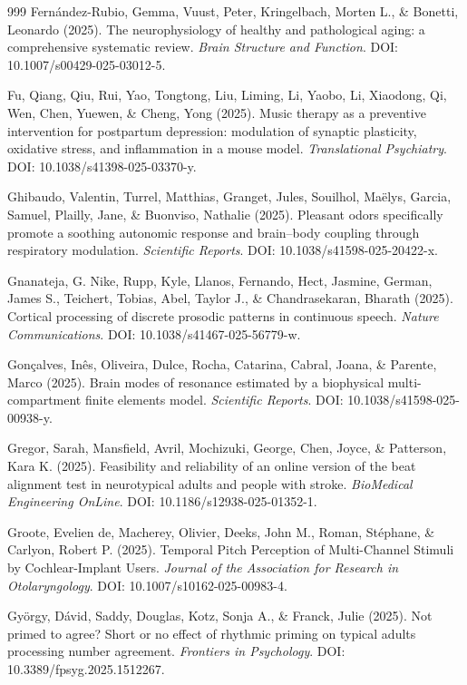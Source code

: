 \documentclass[9pt,onecolumn]{article}
\begin{document}
\begin{thebibliography}{999}
Fernández-Rubio, Gemma, Vuust, Peter, Kringelbach, Morten L., \& Bonetti, Leonardo (2025). The neurophysiology of healthy and pathological aging: a comprehensive systematic review. \textit{Brain Structure and Function}. DOI: 10.1007/s00429-025-03012-5.

Fu, Qiang, Qiu, Rui, Yao, Tongtong, Liu, Liming, Li, Yaobo, Li, Xiaodong, Qi, Wen, Chen, Yuewen, \& Cheng, Yong (2025). Music therapy as a preventive intervention for postpartum depression: modulation of synaptic plasticity, oxidative stress, and inflammation in a mouse model. \textit{Translational Psychiatry}. DOI: 10.1038/s41398-025-03370-y.

Ghibaudo, Valentin, Turrel, Matthias, Granget, Jules, Souilhol, Maëlys, Garcia, Samuel, Plailly, Jane, \& Buonviso, Nathalie (2025). Pleasant odors specifically promote a soothing autonomic response and brain–body coupling through respiratory modulation. \textit{Scientific Reports}. DOI: 10.1038/s41598-025-20422-x.

Gnanateja, G. Nike, Rupp, Kyle, Llanos, Fernando, Hect, Jasmine, German, James S., Teichert, Tobias, Abel, Taylor J., \& Chandrasekaran, Bharath (2025). Cortical processing of discrete prosodic patterns in continuous speech. \textit{Nature Communications}. DOI: 10.1038/s41467-025-56779-w.

Gonçalves, Inês, Oliveira, Dulce, Rocha, Catarina, Cabral, Joana, \& Parente, Marco (2025). Brain modes of resonance estimated by a biophysical multi-compartment finite elements model. \textit{Scientific Reports}. DOI: 10.1038/s41598-025-00938-y.

Gregor, Sarah, Mansfield, Avril, Mochizuki, George, Chen, Joyce, \& Patterson, Kara K. (2025). Feasibility and reliability of an online version of the beat alignment test in neurotypical adults and people with stroke. \textit{BioMedical Engineering OnLine}. DOI: 10.1186/s12938-025-01352-1.

Groote, Evelien de, Macherey, Olivier, Deeks, John M., Roman, Stéphane, \& Carlyon, Robert P. (2025). Temporal Pitch Perception of Multi-Channel Stimuli by Cochlear-Implant Users. \textit{Journal of the Association for Research in Otolaryngology}. DOI: 10.1007/s10162-025-00983-4.

György, Dávid, Saddy, Douglas, Kotz, Sonja A., \& Franck, Julie (2025). Not primed to agree? Short or no effect of rhythmic priming on typical adults processing number agreement. \textit{Frontiers in Psychology}. DOI: 10.3389/fpsyg.2025.1512267.


\end{thebibliography}
\end{document}

